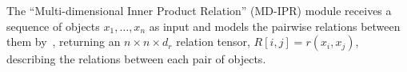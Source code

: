 The ``Multi-dimensional Inner Product Relation'' (MD-IPR) module receives a sequence of objects $x_1, \ldots, x_n$ as input and models the pairwise relations between them by~, returning an $n \times n \times d_r$ relation tensor, $R[i,j] = r(x_i, x_j)$, describing the relations between each pair of objects.

% 